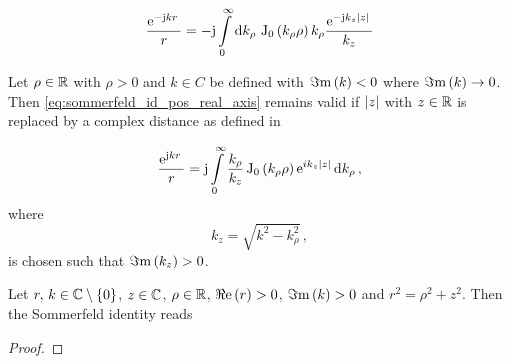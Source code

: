 \begin{equation}\label{eq:sommerfeld_id_pos_real_axis}
	\frac{\mathrm{e}^{-\mathrm{j} k r}\,}{r} = 
	-\mathrm{j}
	\int\limits_{0}^{\infty} \mathrm{d} k_\rho \,
	\operatorname{J}_{0} \left(k_\rho \rho\right) k_\rho 
	\frac{\mathrm{e}^{-\mathrm{j} k_z \left\vert z\right\vert}\,}{k_z}
\end{equation}

\begin{theorem}
	Let $\rho \in \mathbb{R}$ with $\rho > 0$ and $k \in C$ be defined with
	$\Im\mathrm{m}\left(k\right) < 0$ where $\Im\mathrm{m}\left(k\right) \to 0$. Then \eqref{eq:sommerfeld_id_pos_real_axis} 
	remains valid if $\left\vert z\right\vert$ with $z \in \mathbb{R}$ is replaced by a complex distance
	as defined in  

	
\end{theorem}

\begin{equation}\label{eq:sommerfeld_identity_bessel}
	\frac{\mathrm{e}^{\mathrm{j} k r}\,}{r} = \mathrm{j} \int\limits_{0}^{\infty} \frac{k_\rho}{k_z} \operatorname{J}_{0} \left(k_\rho \rho\right) \mathrm{e}^{i k_z \left\vert z\right\vert}\, \mathrm{d} k_\rho \, ,
\end{equation}
where
\begin{equation}\label{eq:k_z}
	k_z = \sqrt{k^2 - k_\rho^2} \, ,
\end{equation}
is chosen such that $\Im\mathrm{m}\left(k_z\right) > 0$.

\begin{lemma}\label{lemma:sommerfeld_identity}
	Let $r,\,k\in\mathbb{C} \setminus \left\{0\right\}$, $z \in \mathbb{C}$, $\rho \in \mathbb{R}$, $\Re\mathrm{e}\left(r\right) > 0$, $\Im\mathrm{m}\left(k\right) > 0$ and $r^2 = \rho^2 + z^2$. Then the Sommerfeld identity reads
\end{lemma}

\begin{proof}
\end{proof}

